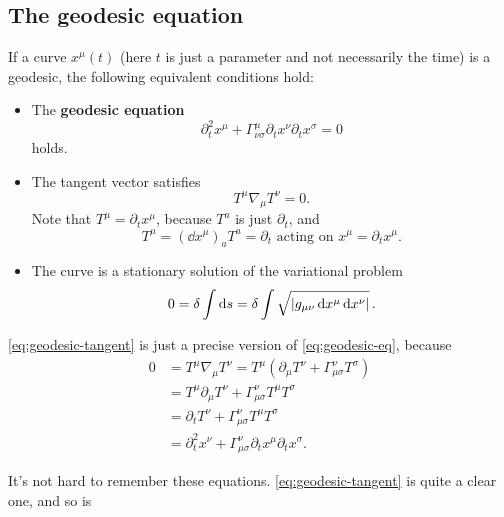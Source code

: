 \documentclass[hyperref, a4paper]{article}
\newcommand*{\concept}[1]{{\textbf{#1}}}
\begin{document}
\subsection{The geodesic equation}

If a curve $x^\mu(t)$ (here $t$ is just a parameter and not necessarily the time) is a geodesic, the following 
equivalent conditions hold:
\begin{itemize}
    \item The \concept{geodesic equation} 
    \begin{equation}
        \partial_t^2 x^\mu + \Gamma^\mu_{\nu \sigma} \partial_t x^\nu \partial_t x^\sigma = 0
        \label{eq:geodesic-eq}
    \end{equation}
    holds.
    \item The tangent vector satisfies 
    \begin{equation}
        T^\mu \nabla_\mu T^\nu = 0.
        \label{eq:geodesic-tangent}
    \end{equation}
    Note that $T^\mu = \partial_t x^\mu$, because $T^a$ is just $\partial_t$, and 
    \begin{equation}
        T^\mu = (\dd{x^\mu})_a T^a = \partial_t \text{ acting on } x^\mu = \partial_t x^\mu.
    \end{equation}
    \item The curve is a stationary solution of the variational problem 
    \begin{equation}
        0 = \var{\int \dd{s}} = \var{\int \sqrt{ \abs{g_{\mu \nu} \dd{x^\mu} \dd{x^\nu}} } }.
    \end{equation}
\end{itemize}

\eqref{eq:geodesic-tangent} is just a precise version of \eqref{eq:geodesic-eq}, because 
\[
    \begin{aligned}
        0 &= T^\mu \nabla_\mu T^\nu = T^\mu (\partial_\mu T^\nu + \Gamma^{\nu}_{\mu \sigma} T^\sigma) \\
        &= T^\mu \partial_\mu T^\nu + \Gamma^{\nu}_{\mu \sigma} T^\mu T^\sigma \\
        &= \partial_t T^\nu  + \Gamma^{\nu}_{\mu \sigma} T^\mu T^\sigma \\
        &= \partial_t^2 x^\nu + \Gamma^{\nu}_{\mu \sigma} \partial_t x^\mu \partial_t x^\sigma.
    \end{aligned}
\]

It's not hard to remember these equations. \eqref{eq:geodesic-tangent} is quite a clear one, and so is 
\end{document}
